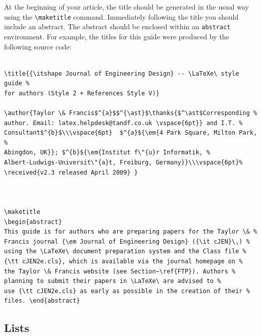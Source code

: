 \documentclass[]{cJEN2e}
\begin{document}
At the beginning of your article, the title should be generated in the usual way using the {\verb"\maketitle"}
command. Immediately following the title you should include an abstract. The abstract should be enclosed within
an {\tt abstract} environment. For example, the titles for this guide were produced by the following source code:
%
\begin{verbatim}

\title{{\itshape Journal of Engineering Design} -- \LaTeXe\ style guide %
for authors (Style 2 + References Style V)}

\author{Taylor \& Francis$^{a}$$^{\ast}$\thanks{$^\ast$Corresponding %
author. Email: latex.helpdesk@tandf.co.uk \vspace{6pt}} and I.T. %
Consultant$^{b}$\\\vspace{6pt}  $^{a}${\em{4 Park Square, Milton Park, %
Abingdon, UK}}; $^{b}${\em{Institut f\"{u}r Informatik, %
Albert-Ludwigs-Universit\"{a}t, Freiburg, Germany}}\\\vspace{6pt}%
\received{v2.3 released April 2009} }



\maketitle
\begin{abstract}
This guide is for authors who are preparing papers for the Taylor \& %
Francis journal {\em Journal of Engineering Design} ({\it cJEN}\,) %
using the \LaTeXe\ document preparation system and the Class file %
{\tt cJEN2e.cls}, which is available via the journal homepage on %
the Taylor \& Francis website (see Section~\ref{FTP}). Authors %
planning to submit their papers in \LaTeXe\ are advised to %
use {\tt cJEN2e.cls} as early as possible in the creation of their %
files. \end{abstract}

\end{verbatim}


\subsection{Lists}
\end{document}
